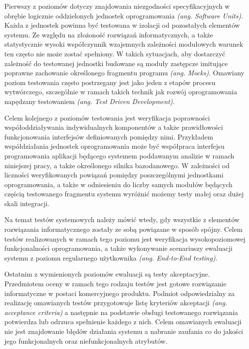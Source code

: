 Pierwszy z poziomów dotyczy znajdowania niezgodności specyfikacyjnych w obrębie logicznie oddzielonych jednostek oprogramowania \textit{(ang. Software Units)}. Każda z jednostek powinna być testowana w izolacji od pozostałych elementów systemu. Ze względu na złożoność rozwiązań informatycznych, a także statystycznie wysoki współczynnik wzajemnych zależności modułowych warunek ten często nie może zostać spełniony. W takich sytuacjach, aby dostarczyć zależność do testowanej jednostki budowane są moduły zastępcze imitujące poprawne zachowanie określonego fragmentu programu \textit{(ang. Mocks)}. Omawiany poziom testowania często postrzegany jest jako jeden z etapów procesu wytwórczego, szczególnie w ramach takich technik jak rozwój oprogramowania napędzany testowaniem \textit{(ang. Test Driven Development)}.

Celem kolejnego z poziomów testowania jest weryfikacja poprawności współoddziaływania indywidualnych komponentów a także prawidłowości funkcjonowania interfejsów definiowanych pomiędzy nimi. Przykładem współdziałania jednostek oprogramowania może być współpraca interfejsu programowania aplikacji będącego systemem poddawanym analizie w ramach niniejszej pracy, a także określonego silnika bazodanowego. W zależności od liczności weryfikowanych powiązań pomiędzy poszczególnymi jednostkami oprogramowania, a także w odniesieniu do liczby samych modułów będących częścią testowanego fragmentu systemu wyróżnić możemy testy małej oraz dużej skali integracji.

Na temat testów systemowych należy mówić wtedy, gdy wszystkie z elementów rozwiązania informatycznego zostały ze sobą powiązane w sposób spójny. Celem testów realizowanych w ramach tego poziomu jest weryfikacja wysokopoziomowej funkcjonalności oprogramowania, a także wykonywanie scenariuszy ewaluacji systemu z poziomu regularnego użytkownika \textit{(ang. End-to-End testing)}.

Ostatnim z wymienionych poziomów ewaluacji są testy akceptacyjne. Przedmiotem oceny w ramach tego rodzaju testów jest gotowe rozwiązanie informatyczne w postaci komercyjnego produktu. Podmiot odpowiedzialny za realizację omawianych testów przygotowuje listę kryteriów akceptacji \textit{(ang. acceptance criteria)} a następnie na podstawie obsługi testowanego rozwiązania potwierdza lub odrzuca spełnienie każdego z nich. Celem omawianych ewaluacji nie jest znajdowanie błędów działania systemu a nabranie zaufania co do jakości jego funkcjonalnych oraz niefunkcjonalnych atrybutów.

